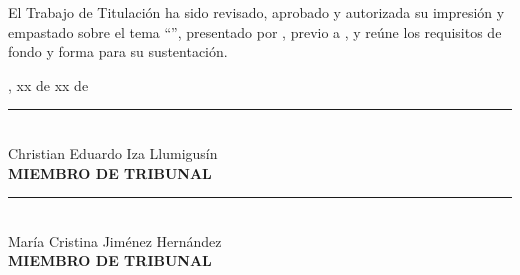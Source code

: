 
El Trabajo de Titulación ha sido revisado, aprobado y autorizada su impresión y empastado sobre el tema ``\UTITituloProyectoMayusculas'', presentado por \UTIAutoresTexto, previo a \UTIFraseObtencionTituloProfesional{}, y reúne los requisitos de fondo y forma para su sustentación.

\vspace{1.5cm}
\UTICiudadPais, xx de xx de \UTIAnio
\vspace{2.5cm}

\begin{center}
\rule{7cm}{0.4pt}\\
Christian Eduardo Iza Llumigusín\\
\textbf{MIEMBRO DE TRIBUNAL}
\end{center}

\vspace{2cm} 

\begin{center}
\rule{7cm}{0.4pt}\\
María Cristina Jiménez Hernández\\
\textbf{MIEMBRO DE TRIBUNAL}
\end{center}